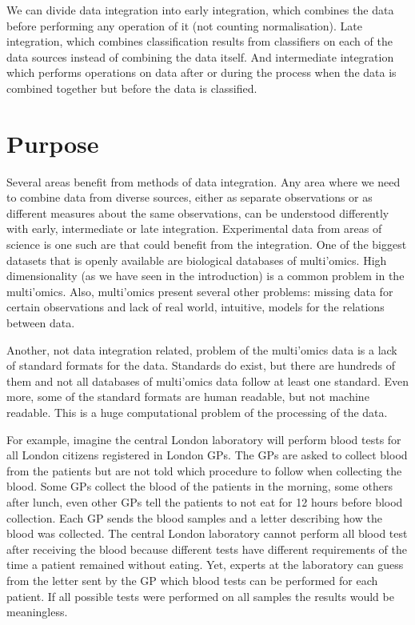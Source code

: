 \documentclass[11pt,a4paper,twoside,openright]{report}
\begin{document}
We can divide data integration into early integration, which combines the data
before performing any operation of it (not counting normalisation).  Late
integration, which combines classification results from classifiers on each of
the data sources instead of combining the data itself.  And intermediate
integration which performs operations on data after or during the process when
the data is combined together but before the data is classified.

\section{Purpose}

Several areas benefit from methods of data integration.  Any area where we need
to combine data from diverse sources, either as separate observations or as
different measures about the same observations, can be understood differently
with early, intermediate or late integration.  Experimental data from areas of
science is one such are that could benefit from the integration.  One of the
biggest datasets that is openly available are biological databases of
multi'omics.  High dimensionality (as we have seen in the introduction) is a
common problem in the multi'omics.  Also, multi'omics present several other
problems: missing data for certain observations and lack of real world,
intuitive, models for the relations between data.

Another, not data integration related, problem of the multi'omics data is a
lack of standard formats for the data.  Standards do exist, but there are
hundreds of them and not all databases of multi'omics data follow at least one
standard.  Even more, some of the standard formats are human readable, but not
machine readable.  This is a huge computational problem of the processing of the
data.

For example, imagine the central London laboratory will perform blood tests for
all London citizens registered in London GPs.  The GPs are asked to collect
blood from the patients but are not told which procedure to follow when
collecting the blood.  Some GPs collect the blood of the patients in the
morning, some others after lunch, even other GPs tell the patients to not eat
for 12 hours before blood collection.  Each GP sends the blood samples and a
letter describing how the blood was collected.  The central London laboratory
cannot perform all blood test after receiving the blood because different tests
have different requirements of the time a patient remained without eating.
Yet, experts at the laboratory can guess from the letter sent by the GP which
blood tests can be performed for each patient.  If all possible tests were
performed on all samples the results would be meaningless.
\end{document}
